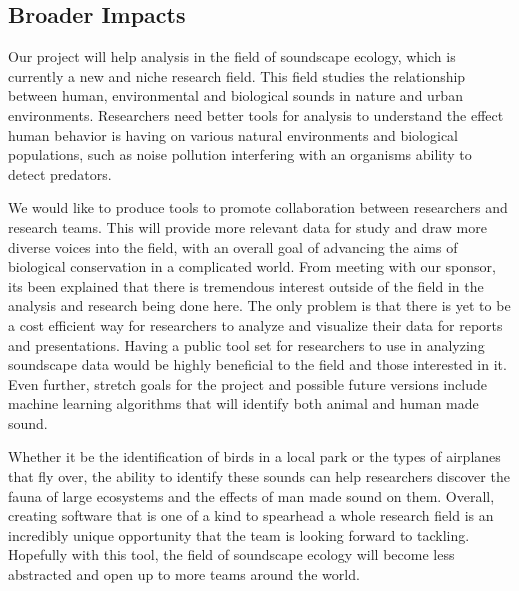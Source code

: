 \subsection{Broader Impacts}
Our project will help analysis in the field of soundscape ecology, which is currently a new and niche research field. This field studies the relationship between human, environmental and biological sounds in nature and urban environments. Researchers need better tools for analysis to understand the effect human behavior is having on various natural environments and biological populations, such as noise pollution interfering with an organism\textquotesingle s ability to detect predators.\par
We would like to produce tools to promote collaboration between researchers and research teams. This will provide more relevant data for study and draw more diverse voices into the field, with an overall goal of advancing the aims of biological conservation in a complicated world. From meeting with our sponsor, it\textquotesingle s been explained that there is tremendous interest outside of the field in the analysis and research being done here. The only problem is that there is yet to be a cost efficient way for researchers to analyze and visualize their data for reports and presentations. Having a public tool set for researchers to use in analyzing soundscape data would be highly beneficial to the field and those interested in it. Even further, stretch goals for the project and possible future versions include machine learning algorithms that will identify both animal and human made sound.\par
Whether it be the identification of birds in a local park or the types of airplanes that fly over, the ability to identify these sounds can help researchers discover the fauna of large ecosystems and the effects of man made sound on them. Overall, creating software that is one of a kind to spearhead a whole research field is an incredibly unique opportunity that the team is looking forward to tackling. Hopefully with this tool, the field of soundscape ecology will become less abstracted and open up to more teams around the world.

